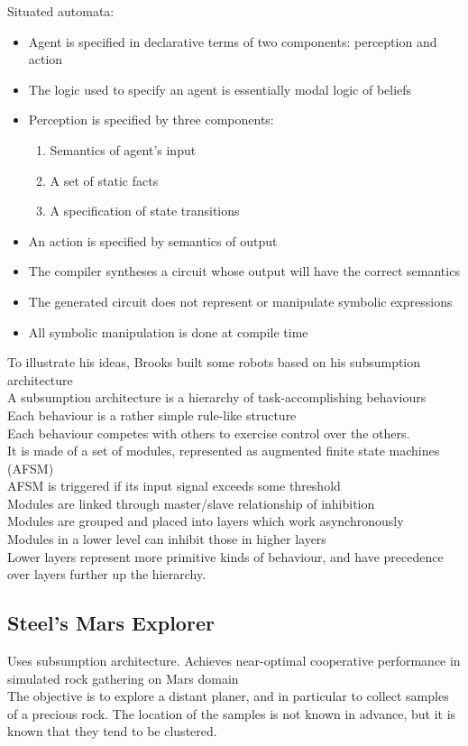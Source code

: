 Situated automata:
\begin{itemize}
\item Agent is specified in declarative terms of two components: perception and action
\item The logic used to specify an agent is essentially modal logic of beliefs
\item Perception is specified by three components:
\begin{enumerate}
\item Semantics of agent's input
\item A set of static facts
\item A specification of state transitions
\end{enumerate}
\item An action is specified by semantics of output
\item The compiler syntheses a circuit whose output will have the correct semantics
\item The generated circuit does not represent or manipulate symbolic expressions
\item All symbolic manipulation is done at compile time
\end{itemize}

To illustrate his ideas, Brooks built some robots based on his subsumption architecture\\
A subsumption architecture is a hierarchy of task-accomplishing behaviours\\
Each behaviour is a rather simple rule-like structure\\
Each behaviour competes with others to exercise control over the others.\\
It is made of a set of modules, represented as augmented finite state machines (AFSM)\\
AFSM is triggered if its input signal exceeds some threshold\\
Modules are linked through master/slave relationship of inhibition\\
Modules are grouped and placed into layers which work asynchronously\\
Modules in a lower level can inhibit those in higher layers\\

Lower layers represent more primitive kinds of behaviour, and have precedence over layers further up the hierarchy.
\subsection{Steel's Mars Explorer}
Uses subsumption architecture. Achieves near-optimal cooperative performance in simulated rock gathering on Mars domain\\
The objective is to explore a distant planer, and in particular to collect samples of a precious rock. The location of the samples is not known in advance, but it is known that they tend to be clustered.\\

